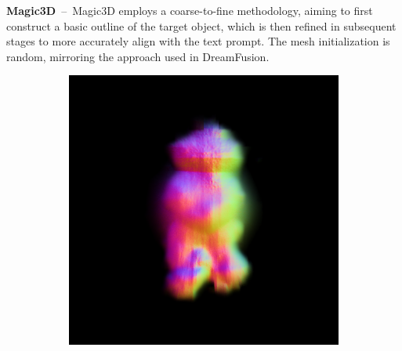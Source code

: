 \textbf{Magic3D}~--~Magic3D employs a coarse-to-fine methodology, aiming to first construct a basic outline of the target object, which is then refined in subsequent stages to more accurately align with the text prompt. The mesh initialization is random, mirroring the approach used in DreamFusion.

\begin{figure}[H]
    \centering
    \begin{subfigure}[b]{0.15\textwidth}
        \centering
        \fontsize{9pt}{7pt}\selectfont{}\vspace{3cm}
        \fontsize{9pt}{7pt}\selectfont{}\vspace{2.85cm}
        \fontsize{9pt}{7pt}\selectfont{}\vspace{1.95cm}
    \end{subfigure}
    \begin{subfigure}[b]{0.2\textwidth}
        \centering
        \includegraphics[width=\textwidth]{etc/a robot made out of plants/magic3d/magic3D_coarse_robot_0_part2.png}

\end{subfigure}
\end{figure}
